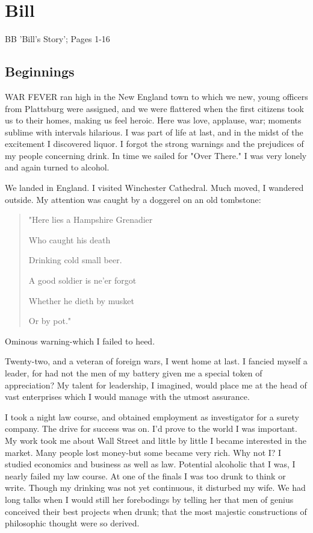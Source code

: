 
\chapter{Bill}

BB 'Bill's Story'; Pages 1-16

\section{Beginnings}

WAR FEVER ran high in the New England town to which we new, young officers from Plattsburg were assigned, 
and we were flattered when the first citizens took us to their homes, making us feel heroic.
Here was love, applause, war; 
moments sublime with intervals hilarious.
I was part of life at last, and in the midst of the excitement I discovered liquor.
I forgot the strong warnings and the prejudices of my people concerning drink.
In time we sailed for "Over There."
I was very lonely and again turned to alcohol.

We landed in England.
I visited Winchester Cathedral.
Much moved, I wandered outside.
My attention was caught by a doggerel on an old tombstone:

\begin{quote}
"Here lies a Hampshire Grenadier

Who caught his death

Drinking cold small beer.

A good soldier is ne'er forgot

Whether he dieth by musket

Or by pot."
\end{quote}

Ominous warning-which I failed to heed.

Twenty-two, and a veteran of foreign wars, I went home at last.
I fancied myself a leader, for had not the men of my battery given me a special token of appreciation?
My talent for leadership, I imagined, would place me at the head of vast enterprises which I would manage with the utmost assurance.

I took a night law course, and obtained employment as investigator for a surety company.
The drive for success was on.
I'd prove to the world I was important.
My work took me about Wall Street and little by little I became interested in the market.
Many people lost money-but some became very rich.
Why not I?
I studied economics and business as well as law.
Potential  alcoholic that I was, I nearly failed my law course.
At one of the finals I was too drunk to think or write.
Though my drinking was not yet continuous, it disturbed my wife.
We had long talks when I would still her forebodings by telling her that men of genius conceived their best projects when drunk; that the most majestic constructions of philosophic thought were so derived.

